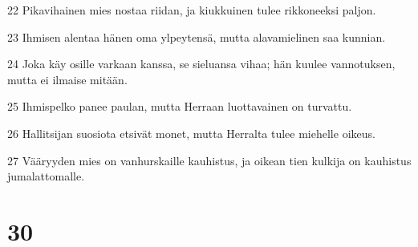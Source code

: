 \par 22 Pikavihainen mies nostaa riidan, ja kiukkuinen tulee rikkoneeksi paljon.
\par 23 Ihmisen alentaa hänen oma ylpeytensä, mutta alavamielinen saa kunnian.
\par 24 Joka käy osille varkaan kanssa, se sieluansa vihaa; hän kuulee vannotuksen, mutta ei ilmaise mitään.
\par 25 Ihmispelko panee paulan, mutta Herraan luottavainen on turvattu.
\par 26 Hallitsijan suosiota etsivät monet, mutta Herralta tulee miehelle oikeus.
\par 27 Vääryyden mies on vanhurskaille kauhistus, ja oikean tien kulkija on kauhistus jumalattomalle.

\chapter{30}

